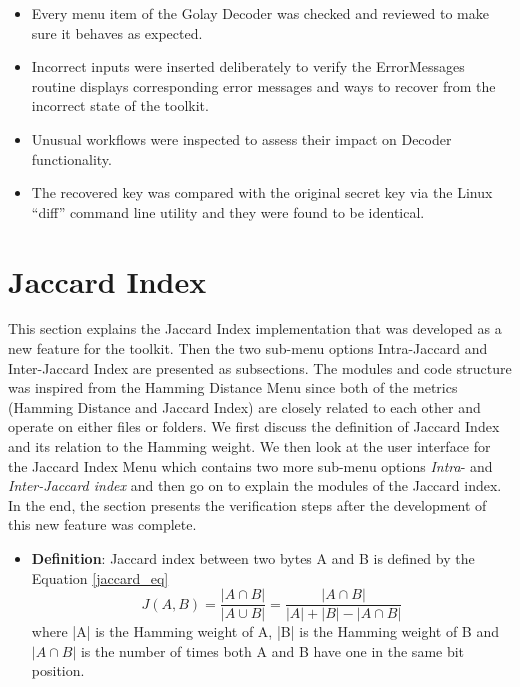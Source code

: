 	\begin{itemize}\itemsep-\the\parsep
		\item Every menu item of the Golay Decoder was checked and reviewed to make sure it behaves as expected.
		\item Incorrect inputs were inserted deliberately to verify the ErrorMessages routine displays corresponding error messages and ways to recover from the incorrect state of the toolkit.
		\item Unusual workflows were inspected to assess their impact on Decoder functionality.
		\item The recovered key was compared with the original secret key via the Linux ``diff'' command line utility and they were found to be identical.
	\end{itemize}

	\section{Jaccard Index}
	\label{jaccardi_index_section}
	This section explains the Jaccard Index implementation that was developed as a new feature for the toolkit. Then the two sub-menu options Intra-Jaccard and Inter-Jaccard Index are presented as subsections.
	The modules and code structure was inspired from the Hamming Distance Menu since both of the metrics (Hamming Distance and Jaccard Index) are closely related to each other and operate on either files or folders. We first discuss the definition of Jaccard Index and its relation to the Hamming weight. We then look at the user interface for the Jaccard Index Menu which contains two more sub-menu options \emph{Intra}- and \emph{Inter-Jaccard index} and then go on to explain the modules of the
	Jaccard index. In the end, the section presents the verification steps after the development of this new feature was complete.\\

	\begin{itemize}
		\item \textbf{Definition}: Jaccard index between two bytes A and B is defined by the Equation \ref{jaccard_eq}
		\begin{equation}
		J(A,B) = \frac {|A \cap B|} {|A\cup B|} = \frac{|A \cap B|} {|A| + |B| - |A \cap B|}
		\label{jaccard_eq}
		\end{equation}
		where |A| is the Hamming weight of A, |B| is the Hamming weight of B and $|A \cap B|$ is the number of times both A and B have one in the same bit position.
	\end{itemize}

